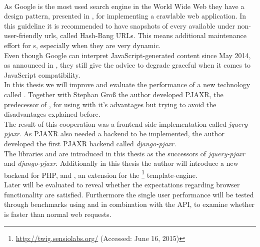 \\
As Google is the most used search engine in the World Wide Web they have a design pattern, presented in \cite{google2014online}, for implementing a crawlable \ajax{} web application.
In this guideline it is recommended to have snapshots of every \webPage{} available under non-user-friendly \gls{url}s, called Hash-Bang URLs.
This means additional maintenance effort for \webSite{}s, especially when they are very dynamic.
\\
Even though Google can interpret JavaScript-generated content since May 2014, as announced in \cite{hendriks2014understanding}, they still give the advice to degrade graceful when it comes to JavaScript compatibility.
\\
In this thesis we will improve and evaluate the performance of a new technology called \lare{}.
Together with Stephan Gro{\ss} the author developed PJAXR, the predecessor of \lare{}, for using \ajax{} with it's advantages but trying to avoid the disadvantages explained before.
\\
The result of this cooperation was a frontend-side implementation called \emph{jquery-pjaxr}.
As PJAXR also needed a backend to be implemented, the author developed the first PJAXR backend called \emph{django-pjaxr}.
\\
The libraries \emph{\lareJS{}} and \emph{\djangoLare{}} are introduced in this thesis as the successors of \emph{jquery-pjaxr} and \emph{django-pjaxr}.
Additionally in this thesis the author will introduce a new \lare{} backend for PHP, \emph{\phpLare{}} and \emph{\twigLare{}}, an extension for the \twig{}\footnote{\url{http://twig.sensiolabs.org/} (Accessed: June 16, 2015)} template-engine.
\\
Later \lare{} will be evaluated to reveal whether the expectations regarding browser functionality are satisfied.
Furthermore the single user performance will be tested through benchmarks using \curl{} and \selenium{} in combination with the \webdriver{} API, to examine whether \lare{} is faster than normal web requests.
